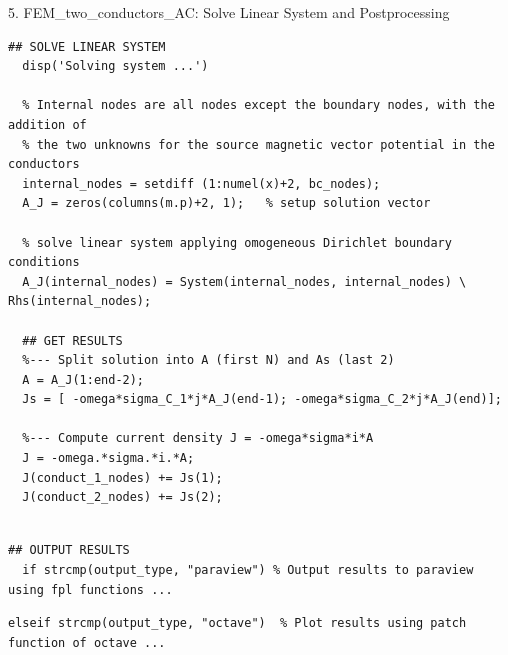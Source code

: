 \documentclass[aspectratio=54,xcolor=dvipsnames]{beamer}
\begin{document}
\begin{frame}[fragile]{5. FEM\_two\_conductors\_AC: Solve Linear System and Postprocessing}
\scriptsize
\begin{lstlisting}[firstnumber=93]
  ## SOLVE LINEAR SYSTEM
  disp('Solving system ...')

  % Internal nodes are all nodes except the boundary nodes, with the addition of 
  % the two unknowns for the source magnetic vector potential in the conductors
  internal_nodes = setdiff (1:numel(x)+2, bc_nodes);
  A_J = zeros(columns(m.p)+2, 1);   % setup solution vector

  % solve linear system applying omogeneous Dirichlet boundary conditions
  A_J(internal_nodes) = System(internal_nodes, internal_nodes) \ Rhs(internal_nodes);

  ## GET RESULTS
  %--- Split solution into A (first N) and As (last 2)
  A = A_J(1:end-2);
  Js = [ -omega*sigma_C_1*j*A_J(end-1); -omega*sigma_C_2*j*A_J(end)];

  %--- Compute current density J = -omega*sigma*i*A
  J = -omega.*sigma.*i.*A;
  J(conduct_1_nodes) += Js(1);
  J(conduct_2_nodes) += Js(2);
  
\end{lstlisting}

\begin{lstlisting}[firstnumber=115]
  ## OUTPUT RESULTS
  if strcmp(output_type, "paraview") % Output results to paraview using fpl functions ...

\end{lstlisting}

\begin{lstlisting}[firstnumber=137]
  elseif strcmp(output_type, "octave")  % Plot results using patch function of octave ...

\end{lstlisting}
\end{frame}
\end{document}
